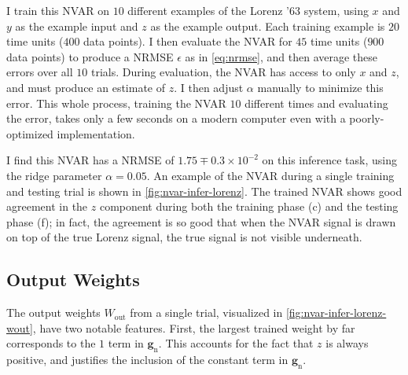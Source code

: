 I train this NVAR on $10$ different examples of the Lorenz '63
system, using $x$ and $y$ as the example input and $z$ as the example
output. Each training example is $20$ time units ($400$ data points). I then evaluate
the NVAR for $45$ time units ($900$ data points) to produce a NRMSE $\epsilon$ as in
\cref{eq:nrmse}, and then average these errors over all $10$
trials. During evaluation, the NVAR has access to only $x$ and $z$,
and must produce an estimate of $z$. I then adjust $\alpha$ manually
to minimize this error. This whole process, training the NVAR $10$
different times and evaluating the error, takes only a few seconds on
a modern computer even with a poorly-optimized implementation.

I find this NVAR has a NRMSE of $1.75\mp0.3\times10^{-2}$ on this
inference task, using the ridge parameter $\alpha = 0.05$. An example
of the NVAR during a single training and testing trial is shown in
\cref{fig:nvar-infer-lorenz}. The trained NVAR shows good agreement in
the $z$ component during both the training phase (c) and the testing
phase (f); in fact, the agreement is so good that when the NVAR signal is
drawn on top of the true Lorenz signal, the true signal is not visible
underneath.

\subsection{Output Weights}\label{sec:nvar-infer-weights}

The output weights $W_\text{out}$ from a single trial, visualized in
\cref{fig:nvar-infer-lorenz-wout}, have two notable features. First,
the largest trained weight by far corresponds to the $1$ term in
$\bm{g}_\text{n}$. This accounts for the fact that $z$ is always
positive, and justifies the inclusion of the constant term in
$\bm{g}_\text{n}$.

